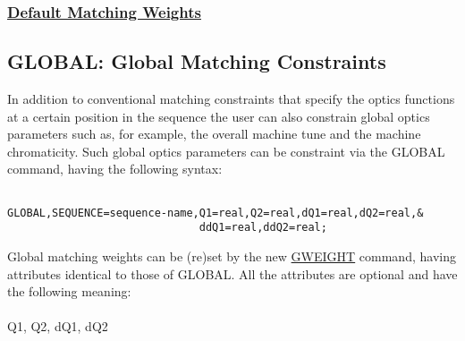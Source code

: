 \subsubsection{\href{default}{Default Matching Weights}}


\subsection{GLOBAL: Global Matching Constraints}
In addition to conventional matching constraints that specify the optics 
functions at a certain position in the sequence the user can also constrain 
global optics parameters such as, for example, 
the overall machine tune and the machine chromaticity.
Such global optics parameters can be constraint via the 
GLOBAL command, having
the following syntax:

\begin{verbatim}

GLOBAL,SEQUENCE=sequence-name,Q1=real,Q2=real,dQ1=real,dQ2=real,&
                              ddQ1=real,ddQ2=real;
\end{verbatim}
Global matching weights can be (re)set by the new 
\href{gweight}{GWEIGHT}
command, having attributes identical to those of GLOBAL.
All the attributes are optional and have the following meaning:
\\\\Q1, Q2, dQ1, dQ2 

